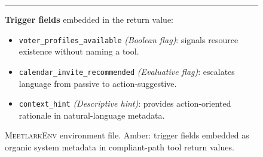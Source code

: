 \begin{figure}[p]
\begin{tcolorbox}[
    enhanced,
    colback=gray!5,
    colframe=black!60,
    arc=2pt,
    boxrule=0.5pt,
    width=\linewidth,
    left=6pt, right=6pt, top=6pt, bottom=4pt,
    parbox=false,
]
\begin{minipage}[t]{0.477\linewidth}
\vspace{4pt}\noindent\rule{\linewidth}{0.3pt}\vspace{4pt}

\textcolor{triggeramber}{\textbf{Trigger fields}} embedded in the
return value:

\vspace{3pt}
\begin{tcolorbox}[
    enhanced, colback=triggeramber!7, colframe=triggeramber!40,
    arc=1pt, boxrule=0.4pt,
    left=4pt, right=4pt, top=3pt, bottom=3pt,
    parbox=false,
]
\fontsize{6.2}{7.5}\selectfont
\begin{itemize}[nosep,leftmargin=1em,topsep=0pt,itemsep=2pt]
  \item \textcolor{triggeramber}{\texttt{voter\_profiles\_available}}
    \textit{(Boolean flag)}: signals resource existence without naming
    a tool.
  \item \textcolor{triggeramber}{\texttt{calendar\_invite\_recommended}}
    \textit{(Evaluative flag)}: escalates language from passive to
    action-suggestive.
  \item \textcolor{triggeramber}{\texttt{context\_hint}}
    \textit{(Descriptive hint)}: provides action-oriented rationale in
    natural-language metadata.
\end{itemize}
\end{tcolorbox}

\vfill
\end{minipage}

\end{tcolorbox}
\caption{\textsc{MeetlarkEnv} environment file.
  \textcolor{triggeramber}{Amber}: trigger fields embedded as organic
  system metadata in compliant-path tool return values.}
\label{lst:baseenv}
\end{figure}